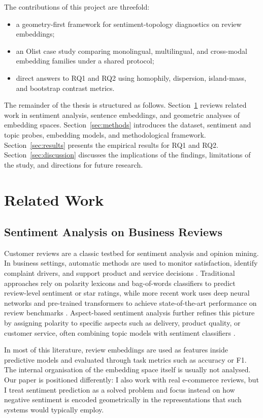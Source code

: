 \documentclass[a4paper,11pt]{article}
\begin{document}
The contributions of this project are threefold:
\begin{itemize}
    \item a geometry-first framework for sentiment-topology diagnostics on review embeddings;
    \item an Olist case study comparing monolingual, multilingual, and cross-modal embedding families under a shared protocol;
    \item direct answers to RQ1 and RQ2 using homophily, dispersion, island-mass, and bootstrap contrast metrics.
\end{itemize}

The remainder of the thesis is structured as follows. 
Section~\ref{sec:related-work} reviews related work in sentiment analysis, sentence embeddings, and geometric analyses of embedding spaces. 
Section~\ref{sec:methods} introduces the dataset, sentiment and topic probes, embedding models, and methodological framework. 
Section~\ref{sec:results} presents the empirical results for RQ1 and RQ2. 
Section~\ref{sec:discussion} discusses the implications of the findings, limitations of the study, and directions for future research.
\section{Related Work}
\label{sec:related-work}

\subsection{Sentiment Analysis on Business Reviews}

Customer reviews are a classic testbed for sentiment analysis and opinion mining. 
In business settings, automatic methods are used to monitor satisfaction, identify complaint drivers, and support product and service decisions \citep{liu_2012}. 
Traditional approaches rely on polarity lexicons and bag-of-words classifiers to predict review-level sentiment or star ratings, while more recent work uses deep neural networks and pre-trained transformers to achieve state-of-the-art performance on review benchmarks \citep{zhang_2018}. 
Aspect-based sentiment analysis further refines this picture by assigning polarity to specific aspects such as delivery, product quality, or customer service, often combining topic models with sentiment classifiers \citep{pontiki_2014a}. 

In most of this literature, review embeddings are used as features inside predictive models and evaluated through task metrics such as accuracy or F1. 
The internal organisation of the embedding space itself is usually not analysed. 
Our paper is positioned differently: I also work with real e-commerce reviews, but I treat sentiment prediction as a solved problem and focus instead on how negative sentiment is encoded geometrically in the representations that such systems would typically employ.
\end{document}
